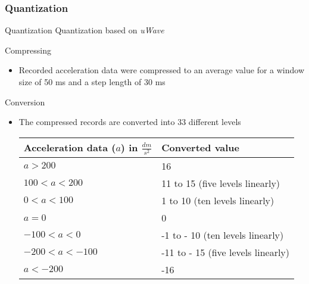 \subsubsection{Quantization}

\begin{frame}{Quantization}
    Quantization based on \textit{uWave} \cite{liu2009uwave}
    \pause
    \begin{block}{Compressing}
        \begin{itemize}
            \item Recorded acceleration data were compressed to an average value for a window size of 50
                ms and a step length of 30 ms
        \end{itemize}
    \end{block}
    \pause
    \begin{block}{Conversion}
        \begin{itemize}
            \item The compressed records are converted into 33 different levels
            \begin{center}
                \tiny
                \begin{tabular}{ll}
                    \textbf{Acceleration data ($a$) in $\frac{dm}{s^2}$} & \textbf{Converted value}\\
                    \hline
                    $a > 200$ & 16\\
                    $100 < a < 200$ & 11 to 15 (five levels linearly)\\
                    $0 < a < 100$ & 1 to 10 (ten levels linearly)\\
                    $a = 0$ & 0\\
                    $-100 < a < 0$ & -1 to - 10 (ten levels linearly)\\
                    $-200 < a < -100$ & -11 to - 15 (five levels linearly)\\
                    $a < -200$ & -16
                \end{tabular}
            \end{center}
        \end{itemize}
    \end{block}
\end{frame}


